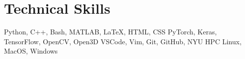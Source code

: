 \section{Technical Skills}

\setlength{\multicolsep}{-4pt}
\begin{multicols}{2}
\raggedcolumns

\resumeSubHeadingListStart
    {Python, C++, Bash, MATLAB, \LaTeX, HTML, CSS}
    {PyTorch, Keras, TensorFlow, OpenCV, Open3D}
    {VSCode, Vim, Git, GitHub, NYU HPC}
    {Linux, MacOS, Windows}
\resumeSubHeadingListEnd

\end{multicols}

